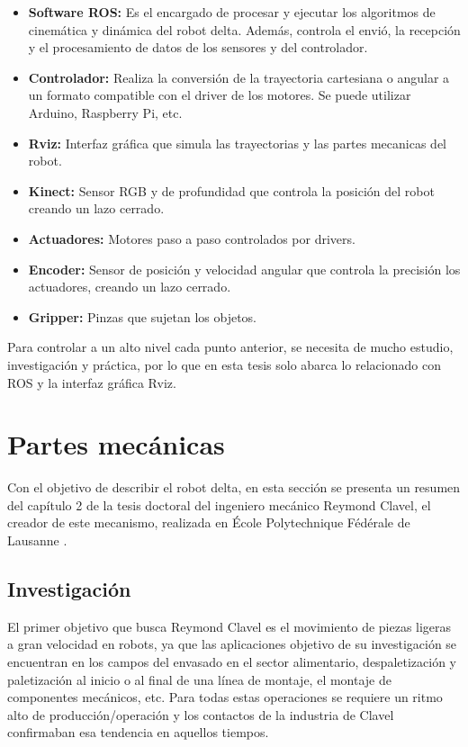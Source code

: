     \begin{itemize}
        \item \textbf{Software ROS:} Es el encargado de procesar y ejecutar los algoritmos de cinemática y dinámica del robot delta. Además, controla el envió, la recepción y el procesamiento de datos de los sensores y del controlador.
        \item \textbf{Controlador:} Realiza la conversión de la trayectoria cartesiana o angular a un formato compatible con el driver de los motores. Se puede utilizar Arduino, Raspberry Pi, etc.
        \item \textbf{Rviz:} Interfaz gráfica que simula las trayectorias y las partes mecanicas del robot.
        \item \textbf{Kinect:} Sensor RGB y de profundidad que controla la posición del robot creando un lazo cerrado.
        \item \textbf{Actuadores:} Motores paso a paso controlados por drivers.
        \item \textbf{Encoder:} Sensor de posición y velocidad angular que controla la precisión los actuadores, creando un lazo cerrado.
        \item \textbf{Gripper:} Pinzas que sujetan los objetos.
    \end{itemize}
    
    Para controlar a un alto nivel cada punto anterior, se necesita de mucho estudio, investigación y práctica, por lo que en esta tesis solo abarca lo relacionado con ROS y la interfaz gráfica Rviz.  
    
    \newpage

    
\section{Partes mecánicas}
    Con el objetivo de describir el robot delta, en esta sección se presenta un resumen del capítulo 2 de la tesis doctoral del ingeniero mecánico Reymond Clavel, el creador de este mecanismo, realizada en École Polytechnique Fédérale de Lausanne \cite{Clavel:31403}. 

    
    \subsection{Investigación}
    El primer objetivo que busca Reymond Clavel es el movimiento de piezas ligeras a gran velocidad en robots, ya que las aplicaciones objetivo de su investigación se encuentran en los campos del envasado en el sector alimentario, despaletización y paletización al inicio o al final de una línea de montaje, el montaje de componentes mecánicos, etc. Para todas estas operaciones se requiere un ritmo alto de producción/operación y los contactos de la industria de Clavel confirmaban esa tendencia en aquellos tiempos.
    
